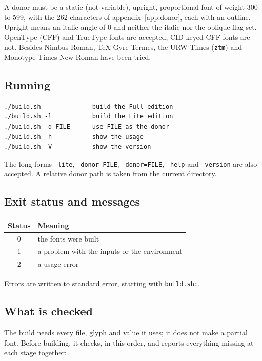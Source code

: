 \documentclass[10pt]{article}
\newcommand\code[1]{\texttt{#1}}
\begin{document}
A donor must be a static (not variable), upright, proportional font of
weight 300 to 599, with the 262 characters of appendix~\ref{app:donor},
each with an outline.  Upright means an italic angle of 0 and neither
the italic nor the oblique flag set.  OpenType (CFF) and TrueType
fonts are accepted; CID-keyed CFF fonts are not.  Besides Nimbus Roman,
TeX Gyre Termes, the URW Times (\code{ztm}) and Monotype Times New
Roman have been tried.

\subsection{Running}

\begin{verbatim}
./build.sh              build the Full edition
./build.sh -l           build the Lite edition
./build.sh -d FILE      use FILE as the donor
./build.sh -h           show the usage
./build.sh -V           show the version
\end{verbatim}

The long forms \code{--lite}, \code{--donor FILE},
\code{--donor=FILE}, \code{--help} and \code{--version} are also
accepted.  A relative donor path is taken from the current directory.

\subsection{Exit status and messages}

\begin{center}
\begin{tabular}{cl}
\toprule
Status & Meaning \\
\midrule
0 & the fonts were built \\
1 & a problem with the inputs or the environment \\
2 & a usage error \\
\bottomrule
\end{tabular}
\end{center}

Errors are written to standard error, starting with \code{build.sh:}.

\subsection{What is checked}\label{sec:preflight}

The build needs every file, glyph and value it uses; it does not make
a partial font.  Before building, it checks, in this order, and
reports everything missing at each stage together:
\end{document}
